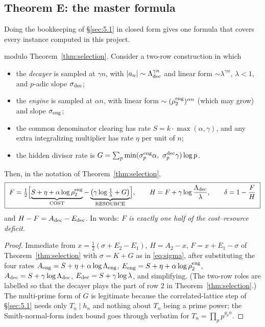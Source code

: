\subsection{Theorem E: the master formula}\label{sec:5.2}

Doing the bookkeeping of \S\ref{sec:5.1} in closed form gives one formula that
covers every instance computed in this project.

\begin{namedthm}\label{thm:E}
\Proved{} modulo Theorem~\ref{thm:selection}.  Consider a two-row construction
in which
\begin{itemize}[leftmargin=1.4em,itemsep=1pt]
\item the \emph{decayer} is sampled at $\gamma n$, with $|a_n|\sim
\Lambda_{\rm dec}^{\gamma n}$ and linear form $\sim\lambda^{\gamma n}$,
$\lambda<1$, and $p$-adic slope $\sigma_{\rm dec}$;
\item the \emph{engine} is sampled at $\alpha n$, with linear form
$\sim(\rho_2^{\rm eng})^{\alpha n}$ (which may grow) and slope
$\sigma_{\rm eng}$;
\item the common denominator clearing has rate $S=k\cdot\max(\alpha,\gamma)$,
and any extra integralizing multiplier has rate $\eta$ per unit of $n$;
\item the hidden divisor rate is
$G=\sum_p\min(\sigma_p^{\rm eng}\alpha,\ \sigma_p^{\rm dec}\gamma)\log p$.
\end{itemize}
Then, in the notation of Theorem~\ref{thm:selection},
\begin{equation}\label{eq:master}
\boxed{\
F=\tfrac12\Bigl[\underbrace{S+\eta+\alpha\log\rho_2^{\rm eng}}_{\rm COST}
-\underbrace{\bigl(\gamma\log\tfrac1\lambda+G\bigr)}_{\rm RESOURCE}\Bigr],
\qquad
H=F+\gamma\log\frac{\Lambda_{\rm dec}}{\lambda},
\qquad
\delta=1-\frac FH\ }
\end{equation}
and $H-F=A_{\rm dec}-E_{\rm dec}$.  In words: \emph{$F$ is exactly one half of
the cost--resource deficit.}
\end{namedthm}

\begin{proof}
Immediate from $x=\tfrac12(\sigma+E_2-E_1)$, $H=A_2-x$, $F=x+E_1-\sigma$ of
Theorem~\ref{thm:selection} with $\sigma=K+G$ as in \eqref{eq:sigma}, after
substituting the four rates
$A_{\rm eng}=S+\eta+\alpha\log\Lambda_{\rm eng}$,
$E_{\rm eng}=S+\eta+\alpha\log\rho_2^{\rm eng}$,
$A_{\rm dec}=S+\gamma\log\Lambda_{\rm dec}$,
$E_{\rm dec}=S+\gamma\log\lambda$, and simplifying.  (The two-row roles are
labelled so that the decayer plays the part of row $2$ in
Theorem~\ref{thm:selection}.)  The multi-prime form of $G$ is legitimate
because the correlated-lattice step of \S\ref{sec:5.1} needs only
$T_n\mid h_n$ and nothing about $T_n$ being a prime power; the Smith-normal-form
index bound goes through verbatim for $T_n=\prod_pp^{g_pn}$.
\end{proof}

